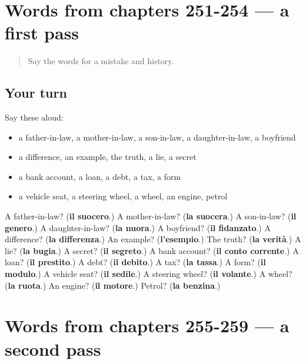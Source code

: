 \section[(dialogue)]{Words from chapters 251-254 — a first pass}

\label{lesson:IT-R259-first-pass-words-from-chapters-251-254}



\begin{quote}
Say the words for a mistake and history.
\end{quote}

\subsection*{Your turn}
Say these aloud:

\begin{itemize}
\raggedright
  \item a father-in-law, a mother-in-law, a son-in-law, a daughter-in-law, a boyfriend
  \item a difference, an example, the truth, a lie, a secret
  \item a bank account, a loan, a debt, a tax, a form
  \item a vehicle seat, a steering wheel, a wheel, an engine, petrol
\end{itemize}

\begin{tcolorbox}[breakable,colback=teal!4,colframe=teal!35!black,title={Before you move on}]
A father-in-law? (\textbf{il suocero}.) A mother-in-law? (\textbf{la suocera}.) A son-in-law? (\textbf{il genero}.) A daughter-in-law? (\textbf{la nuora}.) A boyfriend? (\textbf{il fidanzato}.) A difference? (\textbf{la differenza}.) An example? (\textbf{l'esempio}.) The truth? (\textbf{la verità}.) A lie? (\textbf{la bugia}.) A secret? (\textbf{il segreto}.) A bank account? (\textbf{il conto corrente}.) A loan? (\textbf{il prestito}.) A debt? (\textbf{il debito}.) A tax? (\textbf{la tassa}.) A form? (\textbf{il modulo}.) A vehicle seat? (\textbf{il sedile}.) A steering wheel? (\textbf{il volante}.) A wheel? (\textbf{la ruota}.) An engine? (\textbf{il motore}.) Petrol? (\textbf{la benzina}.)
\end{tcolorbox}
\section[(dialogue)]{Words from chapters 255-259 — a second pass}

\label{lesson:IT-R259-second-pass-words-from-chapters-255-259}



